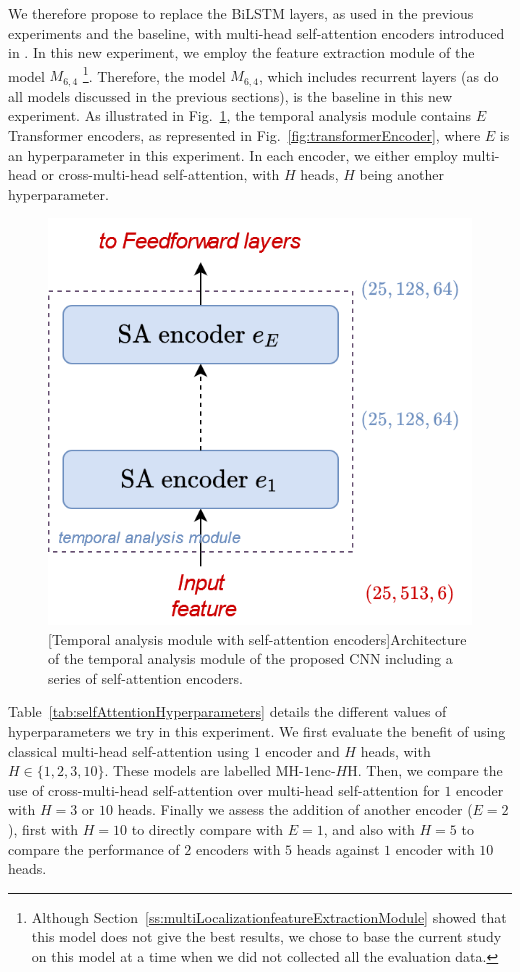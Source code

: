 We therefore propose to replace the BiLSTM layers, as used in the previous experiments and the baseline, with multi-head self-attention encoders introduced in \cite{vaswani_attention_2017}. In this new experiment, we employ the feature extraction module of the model $M_{6,4}$ \footnote{Although Section~\ref{ss:multiLocalizationfeatureExtractionModule} showed that this model does not give the best results, we chose to base the current study on this model at a time when we did not collected all the evaluation data.}. Therefore, the model $M_{6,4}$, which includes recurrent layers (as do all models discussed in the previous sections), is the baseline in this new experiment. As illustrated in Fig.~\ref{fig:multiLoca_TemporalAnalysisModule}, the temporal analysis module contains $E$ Transformer encoders, as represented in Fig.~\ref{fig:transformerEncoder}, where $E$ is an hyperparameter in this experiment. In each encoder, we either employ multi-head or cross-multi-head self-attention, with $H$ heads, $H$ being another hyperparameter.

\begin{figure}[t]
    \centering
    \includegraphics[width=0.45\linewidth]{Images/chap7/TemporalAnalysisModule.png}
    [Temporal analysis module with self-attention encoders]{Architecture of the temporal analysis module of the proposed CNN including a series of self-attention encoders.}
    \label{fig:multiLoca_TemporalAnalysisModule}
\end{figure}

Table~\ref{tab:selfAttentionHyperparameters} details the different values of hyperparameters we try in this experiment. We first evaluate the benefit of using classical multi-head self-attention using $1$ encoder and $H$ heads, with $H \in \{1, 2, 3, 10\}$. These models are labelled $\text{MH-} 1\text{enc-} H\text{H}$. Then, we compare the use of cross-multi-head self-attention over multi-head self-attention for $1$ encoder with $H = 3$ or $10$ heads. Finally we assess the addition of another encoder ($E=2$), first with $H=10$ to directly compare with $E=1$, and also with $H=5$ to compare the performance of $2$ encoders with $5$ heads against $1$ encoder with $10$ heads.

